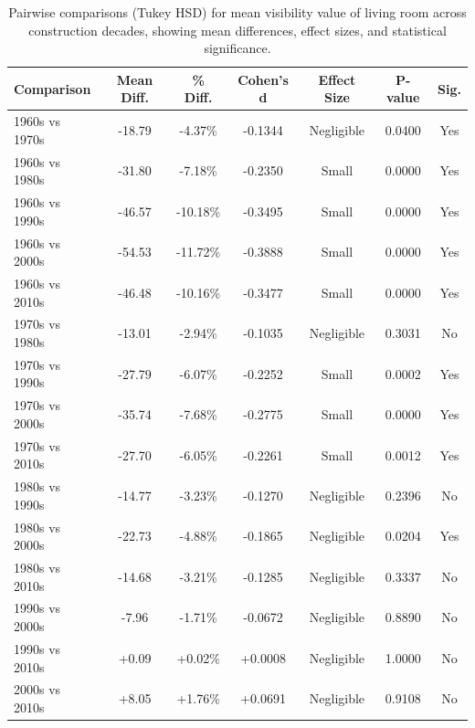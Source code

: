 \begin{table}[htbp]
    \centering
    \begin{tabular}{l|c|c|c|c|c|c}
    \hline
    \textbf{Comparison} & \textbf{Mean Diff.} & \textbf{\% Diff.} & \textbf{Cohen's d} & \textbf{Effect Size} & \textbf{P-value} & \textbf{Sig.} \\
    \hline
    1960s vs 1970s & -18.79 & -4.37\% & -0.1344 & Negligible & 0.0400 & Yes \\
    1960s vs 1980s & -31.80 & -7.18\% & -0.2350 & Small & 0.0000 & Yes \\
    1960s vs 1990s & -46.57 & -10.18\% & -0.3495 & Small & 0.0000 & Yes \\
    1960s vs 2000s & -54.53 & -11.72\% & -0.3888 & Small & 0.0000 & Yes \\
    1960s vs 2010s & -46.48 & -10.16\% & -0.3477 & Small & 0.0000 & Yes \\
    1970s vs 1980s & -13.01 & -2.94\% & -0.1035 & Negligible & 0.3031 & No \\
    1970s vs 1990s & -27.79 & -6.07\% & -0.2252 & Small & 0.0002 & Yes \\
    1970s vs 2000s & -35.74 & -7.68\% & -0.2775 & Small & 0.0000 & Yes \\
    1970s vs 2010s & -27.70 & -6.05\% & -0.2261 & Small & 0.0012 & Yes \\
    1980s vs 1990s & -14.77 & -3.23\% & -0.1270 & Negligible & 0.2396 & No \\
    1980s vs 2000s & -22.73 & -4.88\% & -0.1865 & Negligible & 0.0204 & Yes \\
    1980s vs 2010s & -14.68 & -3.21\% & -0.1285 & Negligible & 0.3337 & No \\
    1990s vs 2000s & -7.96 & -1.71\% & -0.0672 & Negligible & 0.8890 & No \\
    1990s vs 2010s & +0.09 & +0.02\% & +0.0008 & Negligible & 1.0000 & No \\
    2000s vs 2010s & +8.05 & +1.76\% & +0.0691 & Negligible & 0.9108 & No \\
    \hline
    \end{tabular}
    \caption{Pairwise comparisons (Tukey HSD) for mean visibility value of living room across construction decades, showing mean differences, effect sizes, and statistical significance.}
    \label{tab:living_room_vga_tukey_hsd}
\end{table}


